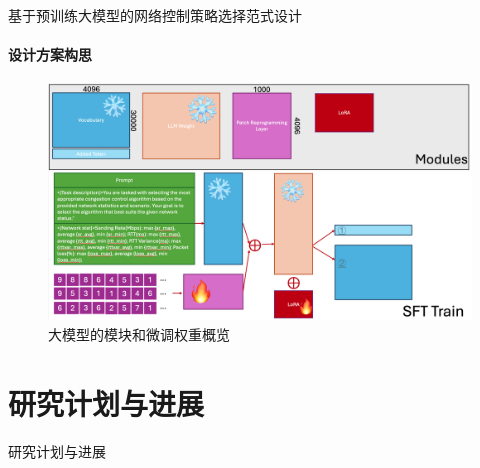 \documentclass{beamer}
\begin{document}
\begin{frame}[fragile]{基于预训练大模型的网络控制策略选择范式设计}
\framesubtitle{设计方案构思}
\begin{figure}
    \centering
    \includegraphics[width=0.75\linewidth]{figures/截屏2024-12-02 16.31.42.png}
    \caption{大模型的模块和微调权重概览}
    \label{fig:enter-label}
\end{figure}

\end{frame}

\section{研究计划与进展}
\begin{frame}[fragile]{研究计划与进展}
\begin{table}[ht]
    \caption{研究计划表}
    \renewcommand\arraystretch{1.25}
    \centering
    \label{tab:agrnksd}
\end{table}
    

\end{frame}
\end{document}

